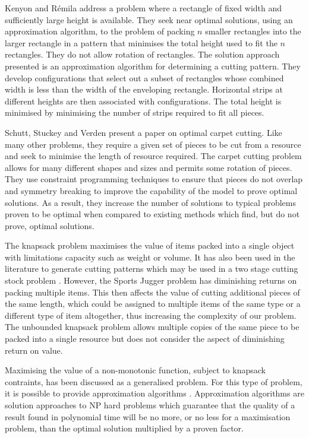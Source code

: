 \documentclass[10pt,a4paper]{article}
\begin{document}
Kenyon and R\'{e}mila \cite{Kenyon2000} address a problem where a rectangle of fixed width and sufficiently large height is available. They seek near optimal solutions, using an approximation algorithm, to the problem of packing $n$ smaller rectangles into the larger rectangle in a pattern that minimises the total height used to fit the $n$ rectangles. They do not allow rotation of rectangles. The solution approach presented is an approximation algorithm for determining a cutting pattern. They develop configurations that select out a subset of rectangles whose combined width is less than the width of the enveloping rectangle. Horizontal strips at different heights are then associated with configurations. The total height is minimised by minimising the number of strips required to fit all pieces.

Schutt, Stuckey and Verden \cite{schutt2011} present a paper on optimal carpet cutting. Like many other problems, they require a given set of pieces to be cut from a resource and seek to minimise the length of resource required. The carpet cutting problem allows for many different shapes and sizes and permits some rotation of pieces. They use constraint programming techniques to ensure that pieces do not overlap and symmetry breaking to improve the capability of the model to prove optimal solutions. As a result, they increase the number of solutions to typical problems proven to be optimal when compared to existing methods which find, but do not prove, optimal solutions.

The knapsack problem maximises the value of items packed into a single object with limitations capacity such as weight or volume. It has also been used in the literature to generate cutting patterns which may be used in a two stage cutting stock problem \cite{GilmoreGomory}. However, the Sports Jugger problem has diminishing returns on packing multiple items. This then affects the value of cutting additional pieces of the same length, which could be assigned to multiple items of the same type or a different type of item altogether, thus increasing the complexity of our problem. The unbounded knapsack problem allows multiple copies of the same piece to be packed into a single resource \cite{Kellerer2004} but does not consider the aspect of diminishing return on value.

Maximising the value of a non-monotonic function, subject to knapsack contraints, has been discussed as a generalised problem. For this type of problem, it is possible to provide approximation algorithms \cite{jonlee2009}. Approximation algorithms are solution approaches to NP hard problems which guarantee that the quality of a result found in polynomial time will be no more, or no less for a maximisation problem, than the optimal solution multiplied by a proven factor. 
\end{document}
